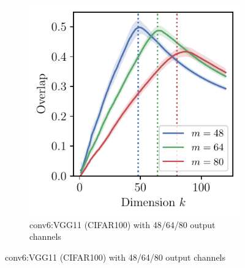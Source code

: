 \begin{figure}[H]
\begin{subfigure}[h]{0.32\columnwidth}
        \label{fig:Overlap_resnet_conv1}
    \end{subfigure}
    \begin{subfigure}[h]{0.32\columnwidth}
        \centering
        \captionsetup{justification=centering}
        \includegraphics[width=\textwidth]{Figures/SubspaceOverlap/NeurIPS/VGG11_conv6.pdf}
        \vspace{-0.2in}
        \caption{conv6:VGG11 (CIFAR100) with 48/64/80 output channels}


\end{subfigure}
\end{figure}
